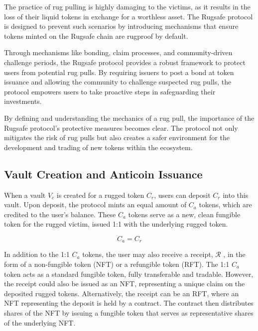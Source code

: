 \documentclass{article}
\begin{document}
The practice of rug pulling is highly damaging to the victims, as it results in the loss of their liquid tokens in exchange for a worthless asset. The Rugsafe protocol is designed to prevent such scenarios by introducing mechanisms that ensure tokens minted on the Rugsafe chain are rugproof by default.

Through mechanisms like bonding, claim processes, and community-driven challenge periods, the Rugsafe protocol provides a robust framework to protect users from potential rug pulls. By requiring issuers to post a bond at token issuance and allowing the community to challenge suspected rug pulls, the protocol empowers users to take proactive steps in safeguarding their investments.

By defining and understanding the mechanics of a rug pull, the importance of the Rugsafe protocol's protective measures becomes clear. The protocol not only mitigates the risk of rug pulls but also creates a safer environment for the development and trading of new tokens within the ecosystem.












\subsection{Vault Creation and Anticoin Issuance}
When a vault $V_c$ is created for a rugged token $C_r$, users can deposit $C_r$ into this vault. Upon deposit, the protocol mints an equal amount of $C_a$ tokens, which are credited to the user's balance. These $C_a$ tokens serve as a new, clean fungible token for the rugged victim, issued 1:1 with the underlying rugged token.

\begin{equation}
C_a = C_r
\end{equation}

In addition to the 1:1 $C_a$ tokens, the user may also receive a receipt, \(\mathcal{R} \) , in the form of a non-fungible token (NFT) or a refungible token (RFT). The 1:1 $C_a$ token acts as a standard fungible token, fully transferable and tradable. However, the receipt could also be issued as an NFT, representing a unique claim on the deposited rugged tokens. Alternatively, the receipt can be an RFT, where an NFT representing the deposit is held by a contract. The contract then distributes shares of the NFT by issuing a fungible token that serves as representative shares of the underlying NFT.
\end{document}
